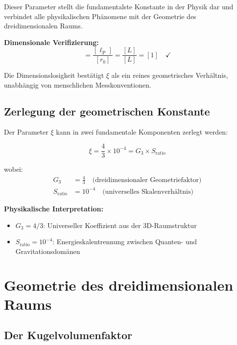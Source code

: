 \documentclass[12pt,a4paper]{report}
\newcommand{\lP}{\ell_{\text{P}}}         %
\newcommand{\rzero}{r_0}                  %
\begin{document}
	Dieser Parameter stellt die fundamentalste Konstante in der Physik dar und verbindet alle physikalischen Phänomene mit der Geometrie des dreidimensionalen Raums.
	
	\textbf{Dimensionale Verifizierung:}
	\begin{equation}
		[\xi] = \frac{[\lP]}{[\rzero]} = \frac{[L]}{[L]} = [1] \quad \checkmark
	\end{equation}
	
	Die Dimensionslosigkeit bestätigt $\xi$ als ein reines geometrisches Verhältnis, unabhängig von menschlichen Messkonventionen.
	
	\subsection{Zerlegung der geometrischen Konstante}
	\label{subsec:decomposition}
	
	Der Parameter $\xi$ kann in zwei fundamentale Komponenten zerlegt werden:
	
	\begin{equation}
		\xi = \frac{4}{3} \times 10^{-4} = G_3 \times S_{\text{ratio}}
	\end{equation}
	
	wobei:
	\begin{align}
		G_3 &= \frac{4}{3} \quad \text{(dreidimensionaler Geometriefaktor)} \\
		S_{\text{ratio}} &= 10^{-4} \quad \text{(universelles Skalenverhältnis)}
	\end{align}
	
	\textbf{Physikalische Interpretation:}
	\begin{itemize}
		\item $G_3 = 4/3$: Universeller Koeffizient aus der 3D-Raumstruktur
		\item $S_{\text{ratio}} = 10^{-4}$: Energieskalentrennung zwischen Quanten- und Gravitationsdomänen
	\end{itemize}
	
	\section{Geometrie des dreidimensionalen Raums}
	\label{sec:3d_space_geometry}
	
	\subsection{Der Kugelvolumenfaktor}
	\label{subsec:sphere_volume_factor}
	
\end{document}
